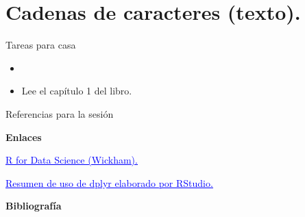\documentclass[
  9pt,
  ignorenonframetext,
]{beamer}
\begin{document}
\hypertarget{cadenas-de-caracteres-texto.}{%
\section{Cadenas de caracteres
(texto).}\label{cadenas-de-caracteres-texto.}}

\begin{frame}{Tareas para casa}
\protect\hypertarget{tareas-para-casa}{}

\end{frame}

\begin{frame}

\begin{itemize}
\item
\item
  Lee el capítulo 1 del libro.
\end{itemize}

\end{frame}

\begin{frame}{Referencias para la sesión}
\protect\hypertarget{referencias-para-la-sesion}{}

\textbf{Enlaces}

\href{https://r4ds.had.co.nz/}{\textcolor{blue}{\underline{R for Data Science (Wickham).}}}

\href{https://github.com/rstudio/cheatsheets/raw/master/data-transformation.pdf}{\textcolor{blue}{\underline{Resumen de uso de dplyr elaborado por RStudio.}}}

\textbf{Bibliografía}

\end{frame}
\end{document}
